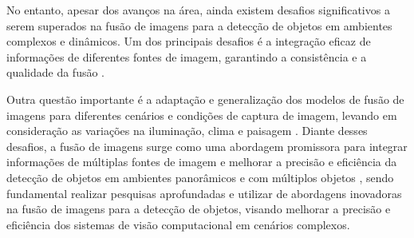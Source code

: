 No entanto, apesar dos avanços na área, ainda existem desafios significativos a serem superados na fusão de imagens para a detecção de objetos em ambientes complexos e dinâmicos. Um dos principais desafios é a integração eficaz de informações de diferentes fontes de imagem, garantindo a consistência e a qualidade da fusão \cite{zhang2020}. 

Outra questão importante é a adaptação e generalização dos modelos de fusão de imagens para diferentes cenários e condições de captura de imagem, levando em consideração as variações na iluminação, clima e paisagem \cite{wu2022}. Diante desses desafios, a fusão de imagens surge como uma abordagem promissora para integrar informações de múltiplas fontes de imagem e melhorar a precisão e eficiência da detecção de objetos em ambientes panorâmicos e com múltiplos objetos \cite{liu2020}, sendo fundamental realizar pesquisas aprofundadas e utilizar de abordagens inovadoras na fusão de imagens para a detecção de objetos, visando melhorar a precisão e eficiência dos sistemas de visão computacional em cenários complexos. 






